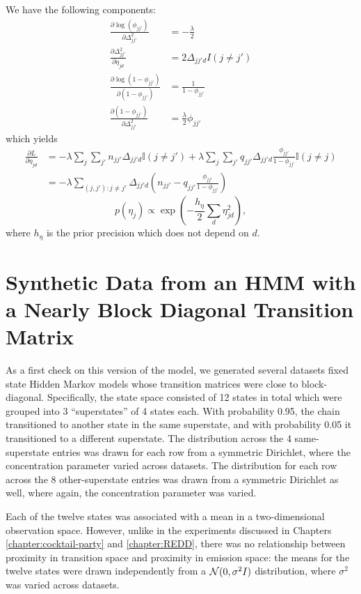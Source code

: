 We have the following components:
\begin{align*}
  \frac{\partial \log(\phi_{jj'})}{\partial \Delta_{jj'}^2} &=
  -\frac{\lambda}{2} \\
  \frac{\partial \Delta_{jj'}^2}{\partial \eta_{jd}} &= 2\Delta_{jj'd} I(j \neq j')\\
  \frac{\partial \log(1 - \phi_{jj'})}{\partial (1 -
    \phi_{jj'})} &= \frac{1}{1 - \phi_{jj'}} \\
  \frac{\partial (1 - \phi_{jj'})}{\partial
    \Delta_{jj'}^2} &= \frac{\lambda}{2} \phi_{jj'}
\end{align*}
which yields
\begin{align*}
  \frac{\partial L}{\partial \eta_{jd}} &= -\lambda \sum_{j}
  \sum_{j'} n_{jj'} \Delta_{jj'd} \mathbb{I}(j \neq j') +
  \lambda \sum_{j}\sum_{j'} q_{jj'} \Delta_{jj'd} \frac{\phi_{jj'}}{1 -
    \phi_{jj'}} \mathbb{I}(j \neq j) \\
  &= - \lambda \sum_{(j,j'): j \neq j'} \Delta_{jj'd} \left(n_{jj'} - q_{jj'}
    \frac{\phi_{jj'}}{1 - \phi_{jj'}}\right)
\end{align*}
\begin{equation*}
  p(\eta_j) \propto \exp\left(-\frac{h_\eta}{2} \sum_{d} \eta_{jd}^2 \right),
\end{equation*}
where $h_{\eta}$ is the prior precision which does not depend on $d$.

\section{Synthetic Data from an HMM with a Nearly Block Diagonal Transition Matrix}
\label{sec:synthetic-data-from}

As a first check on this version of the model, we generated several datasets fixed state Hidden Markov models whose transition matrices were close to block-diagonal.  Specifically, the state space consisted of 12 states in total which were grouped into 3 ``superstates'' of 4 states each.  With probability 0.95, the chain transitioned to another state in the same superstate, and with probability 0.05 it transitioned to a different superstate.  The distribution across the 4 same-superstate entries was drawn for each row from a symmetric Dirichlet, where the concentration parameter varied across datasets.  The distribution for each row across the 8 other-superstate entries was drawn from a symmetric Dirichlet as well, where again, the concentration parameter was varied.

Each of the twelve states was associated with a mean in a two-dimensional observation space.  However, unlike in the experiments discussed in Chapters \ref{chapter:cocktail-party} and \ref{chapter:REDD}, there was no relationship between proximity in transition space and proximity in emission space: the means for the twelve states were drawn independently from a $\mathcal{N}(0,\sigma^2 I)$ distribution, where $\sigma^2$ was varied across datasets.

